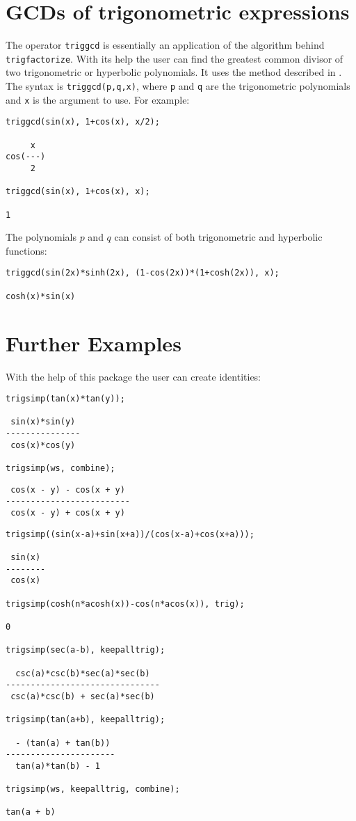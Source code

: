 \documentclass[11pt]{article}
\begin{document}
\section{GCDs of trigonometric expressions}

The operator \texttt{triggcd} is essentially an application of the
algorithm behind \texttt{trigfactorize}.  With its help the user can
find the greatest common divisor of two trigonometric or hyperbolic
polynomials.  It uses the method described in \cite{art}.  The syntax
is \texttt{triggcd(p,q,x)}, where \texttt{p} and \texttt{q} are the
trigonometric polynomials and \texttt{x} is the argument to use.  For
example:
\begin{verbatim}
triggcd(sin(x), 1+cos(x), x/2);

     x
cos(---)
     2

triggcd(sin(x), 1+cos(x), x);

1
\end{verbatim}
The polynomials $p$ and $q$ can consist of both trigonometric and
hyperbolic functions:
\begin{verbatim}
triggcd(sin(2x)*sinh(2x), (1-cos(2x))*(1+cosh(2x)), x);

cosh(x)*sin(x)
\end{verbatim}


\section{Further Examples}

With the help of this package the user can create identities:
\begin{verbatim}
trigsimp(tan(x)*tan(y));

 sin(x)*sin(y)
---------------
 cos(x)*cos(y)

trigsimp(ws, combine);
\end{verbatim}

{\samepage\begin{verbatim}
 cos(x - y) - cos(x + y)
-------------------------
 cos(x - y) + cos(x + y)
\end{verbatim}}

\begin{verbatim}
trigsimp((sin(x-a)+sin(x+a))/(cos(x-a)+cos(x+a)));

 sin(x)
--------
 cos(x)

trigsimp(cosh(n*acosh(x))-cos(n*acos(x)), trig);

0

trigsimp(sec(a-b), keepalltrig);

  csc(a)*csc(b)*sec(a)*sec(b)
-------------------------------
 csc(a)*csc(b) + sec(a)*sec(b)

trigsimp(tan(a+b), keepalltrig);

  - (tan(a) + tan(b))
----------------------
  tan(a)*tan(b) - 1

trigsimp(ws, keepalltrig, combine);

tan(a + b)
\end{verbatim}
\end{document}
